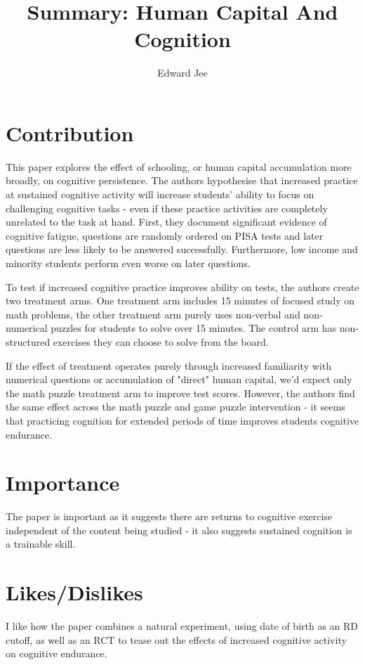 \documentclass{article}
\author{Edward Jee}
\title{
    Summary: Human Capital And Cognition 
}
\begin{document}
\maketitle

\section{Contribution}





This paper explores the effect of schooling, or human capital accumulation more 
broadly, on cognitive persistence. The authors hypothesise that increased practice 
at sustained cognitive activity will increase students' ability to focus on 
challenging cognitive tasks - even if these practice activities are completely unrelated 
to the task at hand. First, they document significant evidence of cognitive fatigue,
questions are randomly ordered on PISA tests and later questions are less likely 
to be answered successfully. Furthermore, low income and minority students perform 
even worse on later questions.


To test if increased cognitive practice improves ability on tests, the authors 
create two treatment arms. One treatment arm includes 15 minutes of focused study on math 
problems, the other treatment arm purely uses non-verbal and non-numerical 
puzzles for students to solve over 15 minutes. The control arm has non-structured 
exercises they can choose to solve from the board.


If the effect of treatment operates purely through increased familiarity with 
numerical questions or accumulation of "direct" human capital, we'd expect only 
the math puzzle treatment arm to improve test scores. However, the authors find the 
same effect across the math puzzle and game puzzle intervention - it seems that 
practicing cognition for extended periods of time improves students cognitive 
endurance.

\section*{Importance}


The paper is important as it suggests there are returns to cognitive exercise 
independent of the content being studied - it also suggests sustained cognition is 
a trainable skill.



\section*{Likes/Dislikes}



I like how the paper combines a natural experiment, using date of birth as an 
RD cutoff, as well as an RCT to tease out the effects of increased cognitive 
activity on cognitive endurance.



    
\end{document}
